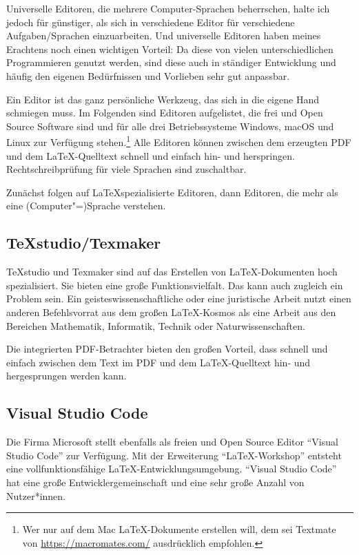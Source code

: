 \documentclass[12pt,	%
				headings=small,		%
				toc=bibliography,	%
			]	%
{scrreprt}		%
\begin{document}
	Universelle Editoren, die mehrere Computer-Sprachen beherrschen, halte ich jedoch für günstiger, als sich in verschiedene Editor für verschiedene Aufgaben/Sprachen einzuarbeiten. Und universelle Editoren haben meines Erachtens noch einen wichtigen Vorteil: Da diese von vielen unterschiedlichen Programmieren genutzt werden, sind diese auch in ständiger Entwicklung und häufig den eigenen Bedürfnissen und Vorlieben sehr gut anpassbar.

	Ein Editor ist das ganz persönliche Werkzeug, das sich in die eigene Hand schmiegen muss.  Im Folgenden sind Editoren aufgelistet, die frei und Open Source Software sind und für alle drei Betriebssysteme Windows, macOS und Linux zur Verfügung stehen.\footnote{Wer nur auf dem Mac \LaTeX-Dokumente erstellen will, dem sei Textmate von \href{https://macromates.com/}{https://macromates.com/} ausdrücklich empfohlen.} Alle Editoren können zwischen dem erzeugten PDF und dem \LaTeX-Quelltext schnell und einfach hin- und herspringen. Rechtschreibprüfung für viele Sprachen sind zuschaltbar.

	Zunächst folgen auf \LaTeX spezialisierte Editoren, dann Editoren, die mehr als eine (Computer"=)Sprache verstehen. 

	\subsection{TeXstudio/Texmaker}
	\label{sub:TeXStudioTexMaker}
		TeXstudio\autocite{texstudio} und Texmaker\autocite{texmaker} sind auf das Erstellen von \LaTeX-Dokumenten hoch spezialisiert. Sie bieten eine große Funktionsvielfalt. Das kann auch zugleich ein Problem sein. Ein geisteswissenschaftliche oder eine juristische Arbeit nutzt einen anderen Befehlsvorrat aus dem großen \LaTeX-Kosmos als eine Arbeit aus den Bereichen Mathematik, Informatik, Technik oder Naturwissenschaften. 

		Die integrierten PDF-Betrachter bieten den großen Vorteil, dass schnell und einfach zwischen dem Text im PDF und dem \LaTeX-Quelltext hin- und hergesprungen werden kann.
			

	\subsection{Visual Studio Code}
	\label{sub:VisualStudioCode}
	Die Firma Microsoft stellt ebenfalls als freien und Open Source Editor \enquote{Visual Studio Code} zur Verfügung.\autocite{VSCode} Mit der Erweiterung \enquote{LaTeX-Workshop} entsteht eine vollfunktionsfähige \LaTeX-Entwicklungsumgebung. \enquote{Visual Studio Code} hat eine große Entwicklergemeinschaft und eine sehr große Anzahl von Nutzer*innen. 
\end{document}
